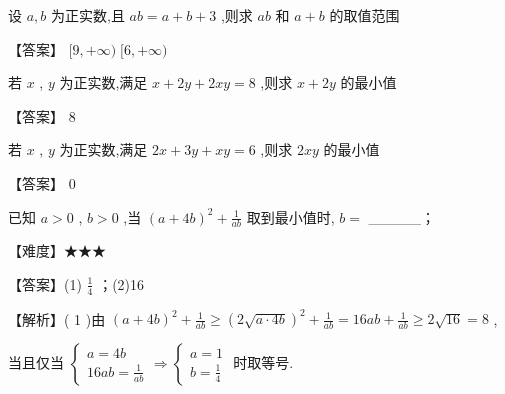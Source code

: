 \documentclass[11pt,a4paper]{article}
\begin{document}
\begin{problem} 
设 \(\displaystyle a,b\) 为正实数,且 \(\displaystyle {ab} = a + b + 3\) ,则求 \(\displaystyle {ab}\) 和 \(\displaystyle a + b\) 的取值范围
\begin{jiexi}[25]
【答案】 \(\displaystyle \lbrack 9, + \infty )\;\lbrack 6, + \infty )\)


\end{jiexi}
\end{problem}
\begin{problem} 
若 \(\displaystyle x\) , \(\displaystyle y\) 为正实数,满足 \(\displaystyle x + {2y} + {2xy} = 8\) ,则求 \(\displaystyle x + {2y}\) 的最小值
\begin{jiexi}[25]
【答案】 8


\end{jiexi}
\end{problem}
\begin{problem} 
若 \(\displaystyle x\) , \(\displaystyle y\) 为正实数,满足 \(\displaystyle {2x} + {3y} + {xy} = 6\) ,则求 \(\displaystyle {2xy}\) 的最小值
\begin{jiexi}[25]
【答案】 0


\end{jiexi}
\end{problem}
\begin{problem} 
已知 \(\displaystyle a > 0\) , \(\displaystyle b > 0\) ,当 \(\displaystyle {\left( a + 4b\right) }^{2} + \frac{1}{ab}\) 取到最小值时, \(\displaystyle b =\) \_\_\_\_\_；
\begin{jiexi}
【难度】★★★

【答案】(1) \(\displaystyle \frac{1}{4}\) ；(2)16

【解析】( 1 )由 \(\displaystyle {\left( a + 4b\right) }^{2} + \frac{1}{ab} \geq  {\left( 2\sqrt{a \cdot  {4b}}\right) }^{2} + \frac{1}{ab} = {16ab} + \frac{1}{ab} \geq  2\sqrt{16} = 8\) ,

当且仅当 \(\displaystyle \left\{  {\begin{array}{l} a = {4b} \\  {16ab} = \frac{1}{ab} \end{array} \Rightarrow  \left\{  \begin{array}{l} a = 1 \\  b = \frac{1}{4} \end{array}\right. }\right.\) 时取等号.


\end{jiexi}
\end{problem}
\end{document}
